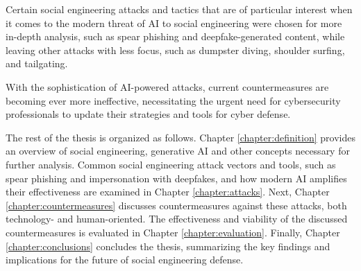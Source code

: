 Certain social engineering attacks and tactics that are of particular interest when it comes to the modern threat of AI to social engineering were chosen for more in-depth analysis, such as spear phishing and deepfake-generated content, while leaving other attacks with less focus, such as dumpster diving, shoulder surfing, and tailgating.




With the sophistication of AI-powered attacks, current countermeasures are becoming ever more ineffective, necessitating the urgent need for cybersecurity professionals to update their strategies and tools for cyber defense.

The rest of the thesis is organized as follows.
Chapter \ref{chapter:definition} provides an overview of social engineering, generative AI and other concepts necessary for further analysis.
Common social engineering attack vectors and tools, such as spear phishing and impersonation with deepfakes, and  how modern AI amplifies their effectiveness are examined in Chapter \ref{chapter:attacks}.
Next, Chapter \ref{chapter:countermeasures} discusses countermeasures against these attacks, both technology- and human-oriented.
The effectiveness and viability of the discussed countermeasures is evaluated in Chapter \ref{chapter:evaluation}.
Finally, Chapter \ref{chapter:conclusions} concludes the thesis, summarizing the key findings and implications for the future of social engineering defense.





